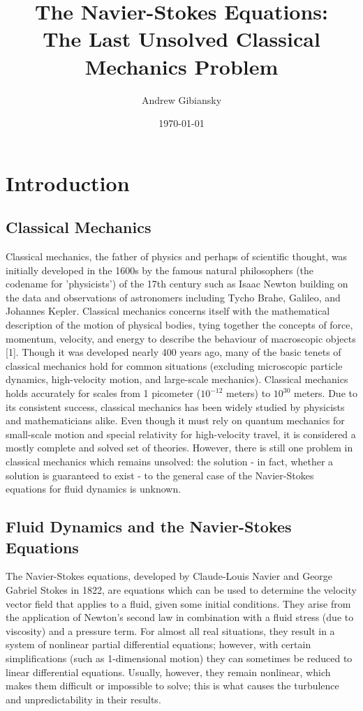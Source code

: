 \documentclass[a4paper,twocolumn]{article}
\title{The Navier-Stokes Equations:\\ The Last Unsolved Classical Mechanics Problem}
\author{Andrew Gibiansky}
\date{\today}
\begin{document}
\maketitle

\section{Introduction}

\subsection{Classical Mechanics}

Classical mechanics, the father of physics and perhaps of scientific thought, was initially developed in the 1600s by the famous natural philosophers (the codename for 'physicists') of the 17th century such as Isaac Newton building on the data and observations of astronomers including Tycho Brahe, Galileo, and Johannes Kepler. Classical mechanics concerns itself with the mathematical description of the motion of physical bodies, tying together the concepts of force, momentum, velocity, and energy to describe the behaviour of macroscopic objects [1]. Though it was developed nearly 400 years ago, many of the basic tenets of classical mechanics hold for common situations (excluding microscopic particle dynamics, high-velocity motion, and large-scale mechanics). Classical mechanics holds accurately for scales from 1 picometer ($10^{-12}$ meters) to $10^{30}$ meters. Due to its consistent success, classical mechanics has been widely studied by physicists and mathematicians alike. Even though it must rely on quantum mechanics for small-scale motion and special relativity for high-velocity travel, it is considered a mostly complete and solved set of theories. However, there is still one problem in classical mechanics which remains unsolved: the solution - in fact, whether a solution is guaranteed to exist - to the general case of the Navier-Stokes equations for fluid dynamics is unknown.

\subsection{Fluid Dynamics and the Navier-Stokes Equations}

The Navier-Stokes equations, developed by Claude-Louis Navier and George Gabriel Stokes in 1822, are equations which can be used to determine the velocity vector field that applies to a fluid, given some initial conditions. They arise from the application of Newton's second law in combination with a fluid stress (due to viscosity) and a pressure term. For almost all real situations, they result in a system of nonlinear partial differential equations; however, with certain simplifications (such as 1-dimensional motion) they can sometimes be reduced to linear differential equations. Usually, however, they remain nonlinear, which makes them difficult or impossible to solve; this is what causes the turbulence and unpredictability in their results. 
\end{document}
